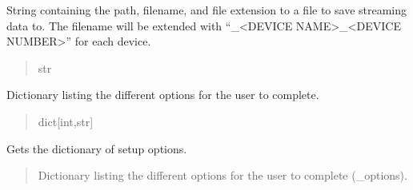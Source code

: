 \documentclass[letterpaper,10pt,english]{sphinxmanual}
\begin{document}
\begin{fulllineitems}
\begin{fulllineitems}
\label{\detokenize{Setup_PodDevices:Setup_PodDevices.Setup_PodDevices._saveFileName}}
\pysigstartsignatures
{}
\pysigstopsignatures
\sphinxAtStartPar
String containing the path, filename, and file extension to a file to             save streaming data to. The filename will be extended with “\_\textless{}DEVICE NAME\textgreater{}\_\textless{}DEVICE NUMBER\textgreater{}”             for each device.
\begin{quote}\begin{description}
\sphinxAtStartPar
str

\end{description}\end{quote}

\end{fulllineitems}


\begin{fulllineitems}
\label{\detokenize{Setup_PodDevices:Setup_PodDevices.Setup_PodDevices._options}}
\pysigstartsignatures
{}
\pysigstopsignatures
\sphinxAtStartPar
Dictionary listing the different options for the user to complete.
\begin{quote}\begin{description}
\sphinxAtStartPar
dict{[}int,str{]}

\end{description}\end{quote}

\end{fulllineitems}


\begin{fulllineitems}
\label{\detokenize{Setup_PodDevices:Setup_PodDevices.Setup_PodDevices.GetOptions}}
\pysigstartsignatures
{}
\pysigstopsignatures
\sphinxAtStartPar
Gets the dictionary of setup options.
\begin{quote}\begin{description}
\sphinxAtStartPar
Dictionary listing the different options for the user to complete (\_options).


\end{description}
\end{quote}
\end{fulllineitems}
\end{fulllineitems}
\end{document}
